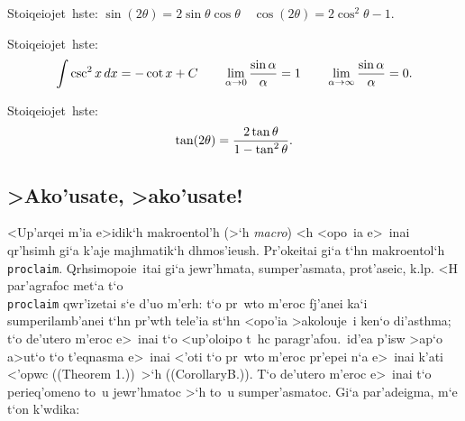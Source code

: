 

\exercise Stoiqeiojet~hste: $\sin(2\theta) = 2\sin\theta\cos\theta \quad
\cos(2\theta) = 2\cos^2\theta - 1  $.

\exercise Stoiqeiojet~hste: $$\int \csc^2x\, dx = -\cot x+ C \qquad
\lim_{\alpha\to 0} {\sin\alpha \over \alpha} = 1 \qquad \lim_{\alpha\to
\infty} {\sin\alpha \over \alpha} = 0.$$

\exercise Stoiqeiojet~hste: $$\tan(2\theta) = {2\tan\theta \over 
1-\tan^2\theta}.$$          

\subsection{>Ako'usate, >ako'usate!}

<Up'arqei m'ia e>idik`h {\tengs makroentol'h\/} (>`h {\sl macro\/}) <h
<opo~ia e>~inai qr'hsimh gi`a k'aje majhmatik`h dhmos'ieush.  Pr'okeitai
gi`a t`hn makroentol`h {\tt\\proclaim}.  Qrhsimopoie~itai gi`a
jew\-r'h\-mata, sumper'asmata, prot'aseic, k.lp.  <H par'agrafoc met`a 
t`o {\tt \\proclaim} qwr'izetai s`e d'uo m'erh: t`o pr~wto m'eroc
fj'anei ka`i sumperilamb'anei t`hn pr'wth tele'ia st`hn <opo'ia
>akolouje~i ken`o di'asthma; t`o de'utero m'eroc e>~inai t`o <up'oloipo
t~hc paragr'afou.\ <H >id'ea p'isw >ap`o a>ut`o t`o
t'eqnasma e>~inai <'oti t`o pr~wto m'eroc pr'epei n`a e>~inai k'ati
<'opwc (({\rm Theorem 1.}))\ >`h (({\rm Corollary\NB{}B.}))\null.  T`o
de'utero m'eroc e>~inai t`o perieq'omeno to~u jewr'hmatoc >`h to~u
sumper'asmatoc.  Gi`a par'adeigma, m`e t`on k'wdika: 

